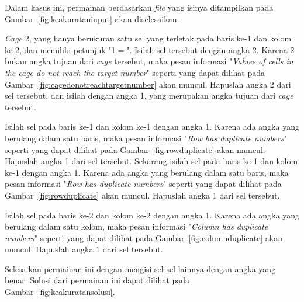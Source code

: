 \begin{enumerate}
Dalam kasus ini, permainan berdasarkan \textit{file} yang isinya ditampilkan pada Gambar~\ref{fig:keakurataninput} akan diselesaikan.

\textit{Cage} 2, yang hanya berukuran satu sel yang terletak pada baris ke-1 dan kolom ke-2, dan memiliki petunjuk "1\begin{math}=\end{math}". Isilah sel tersebut dengan angka 2. Karena 2 bukan angka tujuan dari \textit{cage} tersebut, maka pesan informasi "\textit{Values of cells in the cage do not reach the target number}" seperti yang dapat dilihat pada Gambar~\ref{fig:cagedonotreachtargetnumber} akan muncul. Hapuslah angka 2 dari sel tersebut, dan isilah dengan angka 1, yang merupakan angka tujuan dari \textit{cage} tersebut. 

Isilah sel pada baris ke-1 dan kolom ke-1 dengan angka 1. Karena ada angka yang berulang dalam satu baris, maka pesan informasi "\textit{Row has duplicate numbers}" seperti yang dapat dilihat pada Gambar~\ref{fig:rowduplicate} akan muncul. Hapuslah angka 1 dari sel tersebut. Sekarang isilah sel pada baris ke-1 dan kolom ke-1 dengan angka 1. Karena ada angka yang berulang dalam satu baris, maka pesan informasi "\textit{Row has duplicate numbers}" seperti yang dapat dilihat pada Gambar~\ref{fig:rowduplicate} akan muncul. Hapuslah angka 1 dari sel tersebut.

Isilah sel pada baris ke-2 dan kolom ke-2 dengan angka 1. Karena ada angka yang berulang dalam satu kolom, maka pesan informasi "\textit{Column has duplicate numbers}" seperti yang dapat dilihat pada Gambar~\ref{fig:columnduplicate} akan muncul. Hapuslah angka 1 dari sel tersebut.

Selesaikan permainan ini dengan mengisi sel-sel lainnya dengan angka yang benar. Solusi dari permainan ini dapat dilihat pada Gambar~\ref{fig:keakuratansolusi}.


\end{enumerate}
